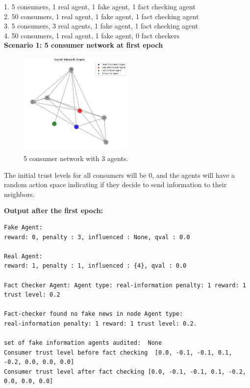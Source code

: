 \documentclass[twoside]{article}
\begin{document}
1. 5 consumers, 1 real agent, 1 fake agent, 1 fact checking agent\\
2. 50 consumers, 1 real agent, 1 fake agent, 1 fact checking agent\\
3. 5 consumers, 3 real agents, 1 fake agent, 1 fact checking agent\\
4. 50 consumers, 1 real agent, 1 fake agent, 0 fact checkers\\

\textbf{Scenario 1: 5 consumer network at first epoch}

\begin{figure}[htbp]
     \centering
     \includegraphics[width=0.5\textwidth]{../results/images/Initial_network.png}
     \caption{5 consumer network with 3 agents.}
     \label{fig: 5 consumer network, 3 agents}
 \end{figure}
 

The initial trust levels for all consumers will be 0, and the agents will have a random action space indicating if they decide to send information to their neighbors.

\pagebreak
\textbf{Output after the first epoch:}

\begin{verbatim}
Fake Agent: 
reward: 0, penalty : 3, influenced : None, qval : 0.0

Real Agent: 
reward: 1, penalty : 1, influenced : {4}, qval : 0.0

Fact Checker Agent: Agent type: real-information penalty: 1 reward: 1 trust level: 0.2

Fact-checker found no fake news in node Agent type: 
real-information penalty: 1 reward: 1 trust level: 0.2.

set of fake information agents audited:  None
Consumer trust level before fact checking  [0.0, -0.1, -0.1, 0.1, -0.2, 0.0, 0.0, 0.0]
Consumer trust level after fact checking [0.0, -0.1, -0.1, 0.1, -0.2, 0.0, 0.0, 0.0]

\end{verbatim}
\end{document}
